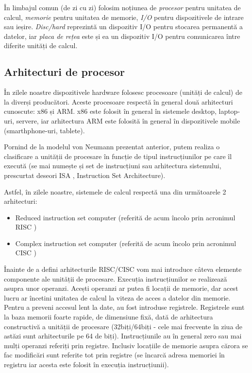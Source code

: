 În limbajul comun (de zi cu zi) folosim noțiunea de \textit{procesor} pentru
unitatea de calcul, \textit{memorie} pentru unitatea de memorie, \textit{I/O}
pentru dispozitivele de intrare sau ieșire. \textit{Disc/hard} reprezintă un
dispozitiv I/O pentru stocarea permanentă a datelor, iar \textit{placa de rețea}
este și ea un dispozitiv I/O pentru comunicarea între diferite unități de
calcul.

\subsection{Arhitecturi de procesor}
\label{sec:hardware-class-proc}

În zilele noastre dispozitivele hardware folosesc procesoare (unități de calcul)
de la diverși producători. Aceste procesoare respectă în general două
arhitecturi cunoscute: x86 și ARM. x86 este folosit în general în sistemele
desktop, laptop-uri, servere, iar arhitectura ARM este folosită în general în
dispozitivele mobile (smarthphone-uri, tablete).

Pornind de la modelul von Neumann prezentat anterior, putem realiza o
clasificare a unității de procesare în funcție de tipul instrucțiunilor pe care
îl execută (se mai numește și set de instrucțiuni sau arhitectura sistemului,
prescurtat deseori ISA , Instruction
Set Architecture).

Astfel, în zilele noastre, sistemele de calcul respectă una din următoarele 2
arhitecturi:

\begin{itemize}
	\item Reduced instruction set computer (referită de acum încolo prin
		acronimul RISC )
	\item Complex instruction set computer (referită de acum încolo prin
		acronimul CISC )
\end{itemize}

Înainte de a defini arhitecturile RISC/CISC vom mai introduce câteva elemente
componente ale unității de procesare. Execuția instrucțiunilor se realizează
asupra unor operanzi. Acești operanzi ar putea fi locații de memorie, dar acest
lucru ar încetini unitatea de calcul la viteza de acces a datelor din memorie.
Pentru a preveni accesul lent la date, au fost introduse registrele. Registrele
sunt la baza memorii foarte rapide, de dimensiune fixă, dată de arhitectura
constructivă a unității de procesare (32biți/64biți - cele mai frecvente în ziua
de astăzi sunt arhitecturile pe 64 de biți). Instrucțiunile au în general zero
sau mai mulți operanzi referiți prin registre. Inclusiv locațiile de memorie
asupra cărora se fac modificări sunt referite tot prin registre (se încarcă
adresa memoriei în registru iar acesta este folosit în execuția instrucțiunii).

